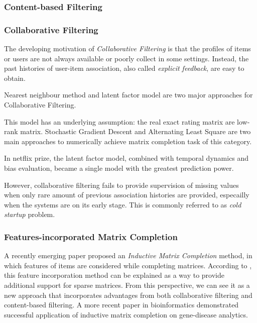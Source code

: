 \documentclass{article} %
\begin{document}
\subsubsection{Content-based Filtering}

\subsubsection{Collaborative Filtering}
The developing motivation of {\it Collaborative Filtering} is that the
profiles of items or users are not always available or poorly collect in
some settings. Instead, the past histories of user-item association, also called {\it
    explicit feedback}, are easy to obtain.  

Nearest neighbour method and latent factor model are two major approaches for
Collaborative Filtering.


This model has an underlying assumption: the real exact rating matrix are
low-rank matrix.   
Stochastic Gradient Descent and Alternating Least Square are two main
approaches to numerically achieve matrix completion task of this category.

In netflix prize, the latent factor model, combined with temporal dynamics and
bias evaluation, became a single model with the greatest prediction power.

However, collaborative filtering fails to provide supervision of missing
values when only rare amount of previous association histories are provided,
especailly when the systems are on its early stage.
This is commonly referred to as {\it cold startup} problem.

\subsubsection{Features-incorporated Matrix Completion}
A recently emerging paper proposed an {\it Inductive Matrix Completion} method, in
which features of items are considered while completing matrices. 
According to \cite{jain2013provable}, this feature incorporation method can be
explained as a way to provide additional support for sparse matrices. 
From this perspective, we can see it as a new approach that incorporates
advantages from both collaborative filtering and content-based filtering. 
A more recent paper \cite{natarajan2014inductive} in bioinformatics 
demonstrated successful application of inductive matrix completion on
gene-disease analytics.
\end{document}
